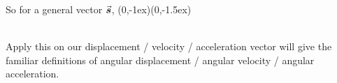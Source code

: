 \documentclass[class=article, crop=false, 12pt]{standalone}
\begin{document}
So for a general vector $\va*{s}$,
{(0,-1ex)}{(0,-1.5ex)}

\hfill\\[1em]
Apply this on our displacement / velocity / acceleration vector will give the familiar definitions of 
angular displacement / angular velocity / angular acceleration.
\end{document}
